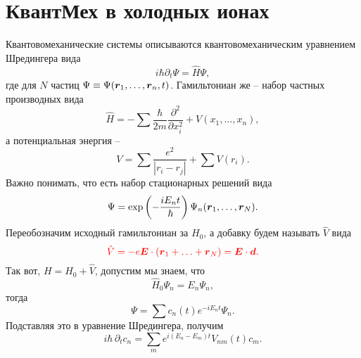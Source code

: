 \section{КвантМех в холодных ионах}

Квантовомеханические системы описываются квантовомеханическим уравнением Шредингера вида
\begin{equation*}
    i \hbar \partial_t \Psi = \hat{H} \Psi,
\end{equation*}
где для $N$ частиц $\Psi \equiv \Psi(\mbox{\boldmath $r$}_1, \ldots, \mbox{\boldmath $r$}_n, t)$. 
Гамильтониан же -- набор частных производных вида
\begin{equation*}
    \hat{H} = - \sum \frac{\hbar}{2m} \frac{\partial^2 }{\partial x_i^2} + V(x_1, \ldots, x_n),
\end{equation*}
а потенциальная энергия --
\begin{equation*}
    V = \sum \frac{e^2}{|r_i - r_j|} + \sum V(r_i).
\end{equation*}
Важно понимать, что есть набор стационарных решений вида
\begin{equation*}
    \Psi = \exp\left(
        - \frac{i E_n t}{\hbar}
    \right) \Psi_n (\mbox{\boldmath $r$}_1, \ldots, \mbox{\boldmath $r$}_N).
\end{equation*}
Переобозначим исходный гамильтониан за $H_0$, а добавку будем называть $\hat{V}$ вида
\begin{equation*}
\textcolor{red}{
    \hat{V} = - e \mbox{\boldmath $E$} \cdot (\mbox{\boldmath $r$}_1+ \ldots+ \mbox{\boldmath $r$}_N) =  \mbox{\boldmath $E$} \cdot \mbox{\boldmath $d$}.
}
\end{equation*}
Так вот, $H = \hat{H}_0 + \hat{V}$, допустим мы знаем, что
\begin{equation*}
    \hat{H}_0 \Psi_n = E_n \Psi_n,
\end{equation*}
тогда
\begin{equation*}
    \Psi = \sum c_n (t) e^{-i E_n t} \Psi_n.
\end{equation*}
Подставляя это в уравнение Шредингера, получим
\begin{equation*}
    i \hbar\, \partial_t c_n = \sum_{m} e^{i(E_n - E_m)t} V_{nm} (t) c_m.
\end{equation*}

